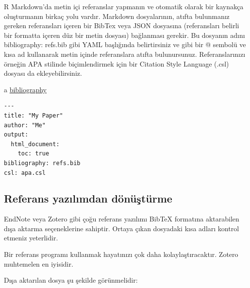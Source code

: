 \documentclass[
  oneside]{book}
\begin{document}
R Markdown'da metin içi referanslar yapmanın ve otomatik olarak bir kaynakça oluşturmanın birkaç yolu vardır. Markdown dosyalarının, atıfta bulunmanız gereken referansları içeren bir BibTex veya JSON dosyasına (referansları belirli bir formatta içeren düz bir metin dosyası) bağlanması gerekir. Bu dosyanın adını bibliography: refs.bib gibi YAML başlığında belirtirsiniz ve \citep{tidyverse} gibi bir @ sembolü ve kısa ad kullanarak metin içinde referanslara atıfta bulunursunuz. Referanslarınızı örneğin APA stilinde biçimlendirmek için bir Citation Style Language (.csl) dosyası da ekleyebilirsiniz.

a \href{https://bookdown.org/yihui/rmarkdown-cookbook/bibliography.html}{bibliography}

\begin{verbatim}
---
title: "My Paper"
author: "Me"
output: 
  html_document:
    toc: true
bibliography: refs.bib
csl: apa.csl
\end{verbatim}

\hypertarget{referans-yazux131lux131mdan-duxf6nuxfcux15ftuxfcrme}{%
\subsection{Referans yazılımdan dönüştürme}\label{referans-yazux131lux131mdan-duxf6nuxfcux15ftuxfcrme}}

EndNote veya Zotero gibi çoğu referans yazılımı BibTeX formatına aktarabilen dışa aktarma seçeneklerine sahiptir. Ortaya çıkan dosyadaki kısa adları kontrol etmeniz yeterlidir.

\begin{warning}
Bir referans programı kullanmak hayatınızı çok daha kolaylaştıracaktır. Zotero muhtemelen en iyisidir.

\end{warning}

Dışa aktarılan dosya şu şekilde görünmelidir:
\end{document}
